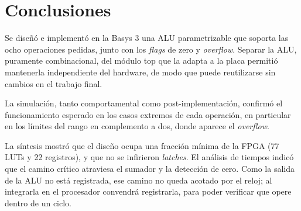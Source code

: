 \section{Conclusiones}
Se diseñó e implementó en la Basys 3 una ALU parametrizable que soporta las ocho operaciones pedidas, junto con los \textit{flags} de zero y \textit{overflow}. Separar la ALU, puramente combinacional, del módulo top que la adapta a la placa permitió mantenerla independiente del hardware, de modo que puede reutilizarse sin cambios en el trabajo final.

La simulación, tanto comportamental como post-implementación, confirmó el funcionamiento esperado en los casos extremos de cada operación, en particular en los límites del rango en complemento a dos, donde aparece el \textit{overflow}.

La síntesis mostró que el diseño ocupa una fracción mínima de la FPGA (77 LUTs y 22 registros), y que no se infirieron \textit{latches}. El análisis de tiempos indicó que el camino crítico atraviesa el sumador y la detección de cero. Como la salida de la ALU no está registrada, ese camino no queda acotado por el reloj; al integrarla en el procesador convendrá registrarla, para poder verificar que opere dentro de un ciclo.
